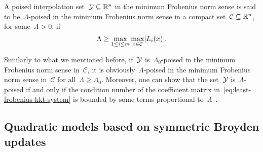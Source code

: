 \begin{definition}
    \label{def:lambda-poisedness-minimum-norm}
    A poised interpolation set~$\xpt \subseteq \R^n$ in the minimum Frobenius norm sense is said to be~$\Lambda$-poised in the minimum Frobenius norm sense in a compact set~$\mathcal{C} \subseteq \mathbb{R}^n$, for some~$\Lambda > 0$, if
    \begin{equation*}
        \Lambda \ge \max_{1 \le i \le m} \max_{x \in \mathcal{C}} \abs{\lagp[i](x)}.
    \end{equation*}
\end{definition}

Similarly to what we mentioned before, if~$\xpt$ is~$\Lambda_0$-poised in the minimum Frobenius norm sense in~$\mathcal{C}$, it is obviously~$\Lambda$-poised in the minimum Frobenius norm sense in~$\mathcal{C}$ for all~$\Lambda \ge \Lambda_0$.
Moreover, one can show that the set~$\xpt$ is~$\Lambda$-poised if and only if the condition number of the coefficient matrix in~\cref{eq:least-frobenius-kkt-system} is bounded by some terms proportional to~$\Lambda$~\cite[thm.~5.8]{Conn_Scheinberg_Vicente_2009b}.

\subsection{Quadratic models based on symmetric Broyden updates}
\label{subsec:symmetric-broyden-updates}

